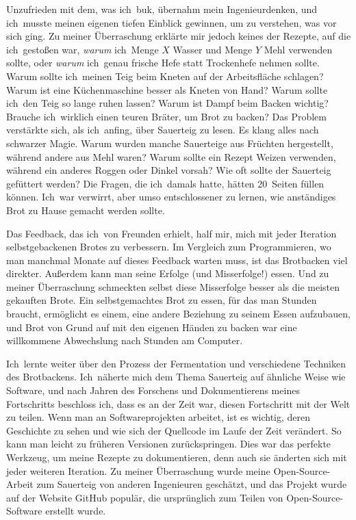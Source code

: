 Unzufrieden mit dem, was ich~buk, übernahm mein Ingenieurdenken, und
ich~musste meinen eigenen tiefen Einblick gewinnen, um zu verstehen, was vor
sich ging. Zu meiner Überraschung erklärte mir jedoch keines der Rezepte, auf
die ich~gestoßen war, \emph{warum} ich~Menge $X$ Wasser und Menge $Y$ Mehl
verwenden sollte, oder \emph{warum} ich~genau frische Hefe statt Trockenhefe
nehmen sollte. Warum sollte ich~meinen Teig beim Kneten auf der Arbeitsfläche
schlagen? Warum ist eine Küchenmaschine besser als Kneten von Hand? Warum
sollte ich~den Teig so lange ruhen lassen? Warum ist Dampf beim Backen
wichtig? Brauche ich~wirklich einen teuren Bräter, um Brot zu backen? Das
Problem verstärkte sich, als ich~anfing, über Sauerteig zu lesen. Es klang
alles nach schwarzer Magie. Warum wurden manche Sauerteige aus Früchten
hergestellt, während andere aus Mehl waren? Warum sollte ein Rezept Weizen
verwenden, während ein anderes Roggen oder Dinkel vorsah? Wie oft sollte der
Sauerteig gefüttert werden? Die Fragen, die ich~damals hatte, hätten
20~Seiten füllen können. Ich~war verwirrt, aber umso entschlossener zu lernen,
wie anständiges Brot zu Hause gemacht werden sollte.

Das Feedback, das ich~von Freunden erhielt, half mir, mich mit jeder
Iteration selbstgebackenen Brotes zu verbessern. Im Vergleich zum
Programmieren, wo man manchmal Monate auf dieses Feedback warten muss, ist das
Brotbacken viel direkter. Außerdem kann man seine Erfolge (und Misserfolge!)
essen. Und zu meiner Überraschung schmeckten selbst diese Misserfolge besser
als die meisten gekauften Brote. Ein selbstgemachtes Brot zu essen, für das
man Stunden braucht, ermöglicht es einem, eine andere Beziehung zu seinem
Essen aufzubauen, und Brot von Grund auf mit den eigenen Händen zu backen war
eine willkommene Abwechslung nach Stunden am Computer.

Ich~lernte weiter über den Prozess der Fermentation und verschiedene Techniken
des Brotbackens. Ich~näherte mich dem Thema Sauerteig auf ähnliche Weise wie
Software, und nach Jahren des Forschens und Dokumentierens meines Fortschritts
beschloss ich, dass es an der Zeit war, diesen Fortschritt mit der Welt zu
teilen. Wenn man an Softwareprojekten arbeitet, ist es wichtig, deren
Geschichte zu sehen und wie sich der Quellcode im Laufe der Zeit verändert.
So kann man leicht zu früheren Versionen zurückspringen. Dies war das perfekte
Werkzeug, um meine Rezepte zu dokumentieren, denn auch sie änderten sich mit
jeder weiteren Iteration. Zu meiner Überraschung wurde meine Open-Source-Arbeit
zum Sauerteig von anderen Ingenieuren geschätzt, und das Projekt wurde auf der
Website GitHub populär, die ursprünglich zum Teilen von Open-Source-Software
erstellt wurde.

